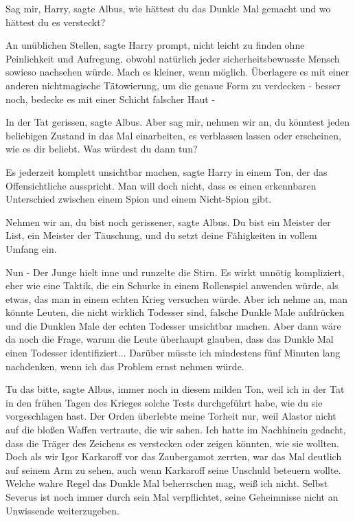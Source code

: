 \glqq{}Sag mir, Harry\grqq{}, sagte Albus, \glqq{}wie hättest du das Dunkle Mal
gemacht und wo hättest du es versteckt?\grqq{}

\glqq{}An unüblichen Stellen\grqq{}, sagte Harry prompt, \glqq{}nicht leicht zu
finden ohne Peinlichkeit und Aufregung, obwohl natürlich jeder
sicherheitsbewusste Mensch sowieso nachsehen würde. Mach es kleiner, wenn
möglich. Überlagere es mit einer anderen nichtmagische Tätowierung, um die
genaue Form zu verdecken - besser noch, bedecke es mit einer Schicht falscher
Haut -\grqq{}

\glqq{}In der Tat gerissen\grqq{}, sagte Albus. \glqq{}Aber sag mir, nehmen wir
an, du könntest jeden beliebigen Zustand in das Mal einarbeiten, es verblassen
lassen oder erscheinen, wie es dir beliebt. Was würdest du dann tun?\grqq{}

\glqq{}Es jederzeit komplett unsichtbar machen\grqq{}, sagte Harry in einem Ton,
der das Offensichtliche ausspricht. \glqq{}Man will doch nicht, dass es einen
erkennbaren Unterschied zwischen einem Spion und einem Nicht-Spion gibt.\grqq{}

\glqq{}Nehmen wir an, du bist noch gerissener\grqq{}, sagte Albus. \glqq{}Du bist
ein Meister der List, ein Meister der Täuschung, und du setzt deine Fähigkeiten
in vollem Umfang ein.\grqq{}

\glqq{}Nun -\grqq{} Der Junge hielt inne und runzelte die Stirn. \glqq{}Es wirkt
unnötig kompliziert, eher wie eine Taktik, die ein Schurke in einem Rollenspiel
anwenden würde, als etwas, das man in einem echten Krieg versuchen würde. Aber
ich nehme an, man könnte Leuten, die nicht wirklich Todesser sind, falsche
Dunkle Male aufdrücken und die Dunklen Male der echten Todesser unsichtbar
machen. Aber dann wäre da noch die Frage, warum die Leute überhaupt glauben,
dass das Dunkle Mal einen Todesser identifiziert... Darüber müsste ich
mindestens fünf Minuten lang nachdenken, wenn ich das Problem ernst nehmen
würde.\grqq{}

\glqq{}Tu das bitte\grqq{}, sagte Albus, immer noch in diesem milden Ton, \glqq{}
weil ich in der Tat in den frühen Tagen des Krieges solche Tests durchgeführt
habe, wie du sie vorgeschlagen hast. Der Orden überlebte meine Torheit nur, weil
Alastor nicht auf die bloßen Waffen vertraute, die wir sahen. Ich hatte im
Nachhinein gedacht, dass die Träger des Zeichens es verstecken oder zeigen
könnten, wie sie wollten. Doch als wir Igor Karkaroff vor das Zaubergamot
zerrten, war das Mal deutlich auf seinem Arm zu sehen, auch wenn Karkaroff seine
Unschuld beteuern wollte. Welche wahre Regel das Dunkle Mal beherrschen mag,
weiß ich nicht. Selbst Severus ist noch immer durch sein Mal verpflichtet, seine
Geheimnisse nicht an Unwissende weiterzugeben.\grqq{}

